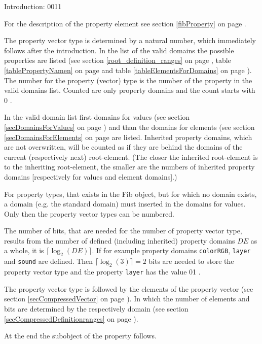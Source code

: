 Introduction: 0011

\bigskip\noindent
For the description of the property element see section \ref{fibProperty} on page \pageref{fibProperty} .

The property vector type is determined by a natural number, which immediately follows after the introduction. In the list of the valid domains the possible properties are listed (see section \ref{root_definition_ranges} on page \pageref{root_definition_ranges}, table \ref{tablePropertyNamen} on page \pageref{tablePropertyNamen} and table \ref{tableElementsForDomains} on page \pageref{tableElementsForDomains}). The number for the property (vector) type is the number of the property in the valid domains list. Counted are only property domains and the count starts with 0 .

In the valid domain list first domains for values (see section \ref{secDomainsForValues} on page \pageref{secDomainsForValues})
and than the domains for elements (see section \ref{secDomainsForElements} on page \pageref{secDomainsForElements} are listed.
Inherited property domains, which are not overwritten, will be counted as if they are behind the domains of the current (respectively next) root-element. (The closer the inherited root-element is to the inheriting root-element, the smaller are the numbers of inherited property domains [respectively for values and element domains].)

For property types, that exists in the Fib object, but for which no domain exists, a domain (e.g. the standard domain) must inserted in the domains for values. Only then the property vector types can be numbered.

The number of bits, that are needed for the number of property vector type, results from the number of defined (including inherited) property domains $DE$ as a whole, it is $\lceil \log_2(DE) \rceil $.
If for example property domains \verb|colorRGB|, \verb|layer| and \verb|sound| are defined. Then $\lceil \log_2(3) \rceil = 2$ bits are needed to store the property vector type and the property \verb|layer| has the value 01 .

The property vector type is followed by the elements of the property vector (see section \ref{secCompressedVector} on page \pageref{secCompressedVector}). In which the number of elements and bits are determined by the respectively domain (see section \ref{secCompressedDefinitionranges} on page \pageref{secCompressedDefinitionranges}).

At the end the subobject of the property follows.

